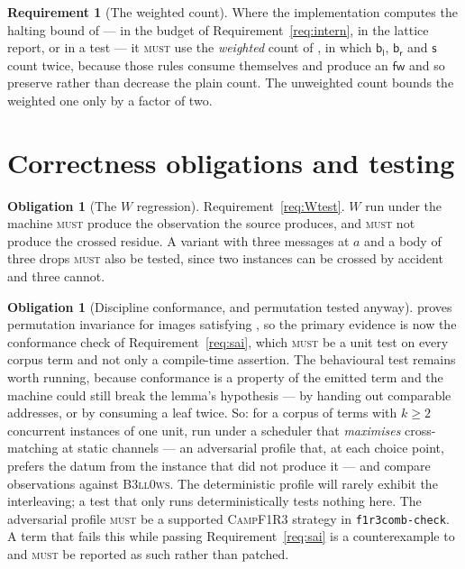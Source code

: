 \documentclass[11pt,a4paper]{article}
\newcommand{\code}[1]{\texttt{#1}}
\newcommand{\Camp}{\textsc{CampF1R3}}
\newcommand{\Bell}{\textsc{B3ll0ws}}
\newcommand{\MUST}{\textsc{must}}
\newcommand{\fw}{\mathsf{fw}}
\newcommand{\bl}{\mathsf{b}_{\mathsf{l}}}
\newcommand{\br}{\mathsf{b}_{\mathsf{r}}}
\newcommand{\sy}{\mathsf{s}}
\theoremstyle{definition}
\newtheorem{requirement}[definition]{Requirement}
\newtheorem{obligation}[definition]{Obligation}
\theoremstyle{plain}
\begin{document}
\begin{requirement}[The weighted count]\label{req:weighted}
Where the implementation computes the halting bound of
\cite[Prop.~9.9]{draft3} --- in the budget of Requirement~\ref{req:intern}, in
the lattice report, or in a test --- it \MUST{} use the \emph{weighted} count
of \cite[Def.~6.6]{logic}, in which $\bl$, $\br$ and $\sy$ count twice,
because those rules consume themselves and produce an $\fw$ and so preserve
rather than decrease the plain count. The unweighted count bounds the weighted
one only by a factor of two.
\end{requirement}

\section{Correctness obligations and testing}\label{sec:test}

\begin{obligation}[The $W$ regression]\label{obl:W}
Requirement~\ref{req:Wtest}. $W$ run under the machine \MUST{} produce the
observation the source produces, and \MUST{} not produce the crossed residue.
A variant with three messages at $a$ and a body of three drops \MUST{} also be
tested, since two instances can be crossed by accident and three cannot.
\end{obligation}

\begin{obligation}[Discipline conformance, and permutation tested anyway]
\label{obl:permutetest}
\cite[Lem.~6.11]{draft3} proves permutation invariance for images satisfying
\cite[Def.~6.10]{draft3}, so the primary evidence is now the conformance check
of Requirement~\ref{req:sai}, which \MUST{} be a unit test on every corpus
term and not only a compile-time assertion. The behavioural test remains
worth running, because conformance is a property of the emitted term and the
machine could still break the lemma's hypothesis --- by handing out comparable
addresses, or by consuming a leaf twice. So: for a corpus of terms with $k \geq 2$ concurrent
instances of one unit, run under a scheduler that \emph{maximises}
cross-matching at static channels --- an adversarial profile that, at each
choice point, prefers the datum from the instance that did not produce it ---
and compare observations against \Bell. The deterministic profile will rarely
exhibit the interleaving; a test that only runs deterministically tests
nothing here. The adversarial profile \MUST{} be a supported \Camp{} strategy
in \code{f1r3comb-check}. A term that fails this while passing
Requirement~\ref{req:sai} is a counterexample to
\cite[Lem.~6.11]{draft3} and \MUST{} be reported as such rather than patched.
\end{obligation}
\end{document}
